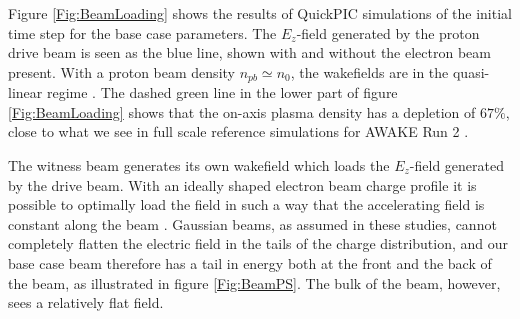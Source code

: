 \documentclass[aps,prstab,reprint,amsmath,amssymb,groupedaddress]{revtex4-1}
\begin{document}
Figure \ref{Fig:BeamLoading} shows the results of QuickPIC simulations of the initial time step for the base case
parameters. The $E_{z}$-field generated by the proton drive beam is seen as the blue line, shown with and without the
electron beam present. With a proton beam density $n_{pb} \simeq n_{0}$, the wakefields are in the quasi-linear regime
\cite{rosenzweig:2010}. The dashed green line in the lower part of figure \ref{Fig:BeamLoading} shows that the on-axis
plasma density has a depletion of $67\%$, close to what we see in full scale reference simulations for AWAKE Run 2
\cite{awake_collaboration:2016}.


The witness beam generates its own wakefield which loads the $E_{z}$-field generated by the drive beam. With an ideally
shaped electron beam charge profile it is possible to optimally load the field in such a way that the accelerating field
is constant along the beam \cite{katsouleas:1987, tzoufras:2009}. Gaussian beams, as assumed in these studies, cannot
completely flatten the electric field in the tails of the charge distribution, and our base case beam therefore has a
tail in energy both at the front and the back of the beam, as illustrated in figure \ref{Fig:BeamPS}. The bulk of the
beam, however, sees a relatively flat field.
\end{document}

